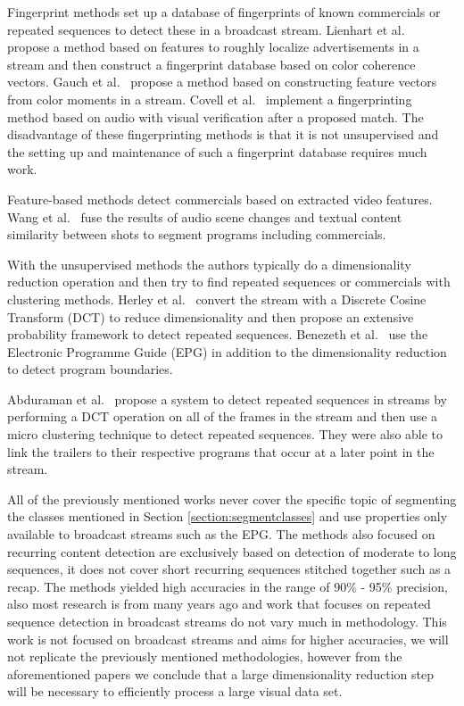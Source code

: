 \documentclass{report}
\begin{document}
Fingerprint methods set up a database of fingerprints of known commercials or repeated sequences to detect these in a broadcast stream. Lienhart et al.\ \cite{lienhart1997detection} propose a method based on features to roughly localize advertisements in a stream and then construct a fingerprint database based on color coherence vectors. Gauch et al.\ \cite{gauch2006finding} propose a method based on constructing feature vectors from color moments in a stream. Covell et al.\ \cite{covell2006advertisement} implement a fingerprinting method based on audio with visual verification after a proposed match. The disadvantage of these fingerprinting methods is that it is not unsupervised and the setting up and maintenance of such a fingerprint database requires much work.


Feature-based methods detect commercials based on extracted video features. Wang et al.\ \cite{wang2008multimodal} fuse the results of audio scene changes and textual content similarity between shots to segment programs including commercials.

With the unsupervised methods the authors typically do a dimensionality reduction operation and then try to find repeated sequences or commercials with clustering methods. Herley et al.\ \cite{herley2006argos} convert the stream with a Discrete Cosine Transform (DCT) to reduce dimensionality and then propose an extensive probability framework to detect repeated sequences. Benezeth et al.\ \cite{benezeth2010unsupervised} use the Electronic Programme Guide (EPG) in addition to the dimensionality reduction to detect program boundaries.

Abduraman et al.\ \cite{abduraman2011unsupervised} propose a system to detect repeated sequences in streams by performing a DCT operation on all of the frames in the stream and then use a micro clustering technique to detect repeated sequences. They were also able to link the trailers to their respective programs that occur at a later point in the stream.

All of the previously mentioned works never cover the specific topic of segmenting the classes mentioned in Section \ref{section:segmentclasses} and use properties only available to broadcast streams such as the EPG. The methods also focused on recurring content detection are exclusively based on detection of moderate to long sequences, it does not cover short recurring sequences stitched together such as a recap. The methods yielded high accuracies in the range of 90\% - 95\% precision, also most research is from many years ago and work that focuses on repeated sequence detection in broadcast streams do not vary much in methodology. This work is not focused on broadcast streams and aims for higher accuracies, we will not replicate the previously mentioned methodologies, however from the aforementioned papers we conclude that a large dimensionality reduction step will be necessary to efficiently process a large visual data set.
\\
\end{document}
